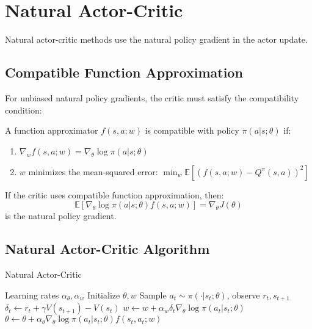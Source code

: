 \section{Natural Actor-Critic}

Natural actor-critic methods use the natural policy gradient in the actor update.

\subsection{Compatible Function Approximation}

For unbiased natural policy gradients, the critic must satisfy the compatibility condition:

\begin{definition}
A function approximator $f(s,a; w)$ is compatible with policy $\pi(a|s; \theta)$ if:
\begin{enumerate}
    \item $\nabla_w f(s,a; w) = \nabla_\theta \log \pi(a|s; \theta)$
    \item $w$ minimizes the mean-squared error: $\min_w \mathbb{E} [(f(s,a; w) - Q^\pi(s,a))^2]$
\end{enumerate}
\end{definition}

\begin{theorem}
If the critic uses compatible function approximation, then:
\begin{equation}
\mathbb{E} \left[ \nabla_\theta \log \pi(a|s; \theta) f(s,a; w) \right] = \nabla_\theta J(\theta)
\end{equation}
is the natural policy gradient.
\end{theorem}

\subsection{Natural Actor-Critic Algorithm}

\begin{algorithm}
\caption{Natural Actor-Critic}
\begin{algorithmic}
\REQUIRE Learning rates $\alpha_\theta, \alpha_w$
\STATE Initialize $\theta, w$
        \STATE Sample $a_t \sim \pi(\cdot|s_t; \theta)$, observe $r_t, s_{t+1}$
        \STATE $\delta_t \leftarrow r_t + \gamma V(s_{t+1}) - V(s_t)$
        \STATE $w \leftarrow w + \alpha_w \delta_t \nabla_\theta \log \pi(a_t|s_t; \theta)$ 
        \STATE $\theta \leftarrow \theta + \alpha_\theta \nabla_\theta \log \pi(a_t|s_t; \theta) f(s_t, a_t; w)$ 
    \ENDFOR
\ENDFOR
\end{algorithmic}
\end{algorithm}

